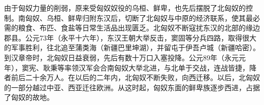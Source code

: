 由于匈奴力量的削弱，原来受匈奴奴役的乌桓、鲜卑，也先后摆脱了北匈奴的控制。南匈奴、乌桓、鲜卑归附东汉后，切断了北匈奴与中原的经济联系，使其最必需的粮食、布匹、食盐等日常生活品出现匮乏。北匈奴不断寇扰东汉的北部的缘边郡县。公元73年（永平十六年），东汉王朝大举反击，窦固等分兵四路，取得很大的军事胜利，往北追至蒲类海（新疆巴里坤湖），并留屯于伊吾卢城（新疆哈密）。到汉章帝时，北匈奴日益衰弱，先后有数十万口入塞投降。公元89年（永元元年），窦宪、耿秉等率领汉军会合南匈奴大举北进，与北单于交战，连战皆捷，降者前后二十余万人。在以后的二年内，北匈奴不断失败，向西迁移。以后，北匈奴的一部分越过中亚、西亚迁往欧洲。从这时起，匈奴东面的鲜卑族逐步西进，占据了匈奴的故地。
















